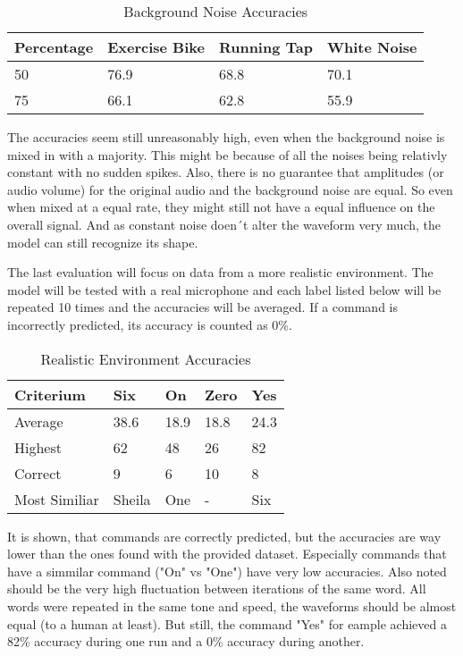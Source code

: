 \begin{table}[H]
  \begin{center}
    \begin{tabular}{l|l|l|l}
      Percentage & Exercise Bike & Running Tap & White Noise\\\hline
      50 & 76.9 & 68.8 & 70.1\\
      75 & 66.1 & 62.8 & 55.9\\
    \end{tabular}
    \caption{Background Noise Accuracies}
  \end{center}
\end{table}

The accuracies seem still unreasonably high, even when the background noise is mixed in with a majority. This might be because of all the noises being
relativly constant with no sudden spikes. Also, there is no guarantee that amplitudes (or audio volume) for the original audio and the background noise are equal. So 
even when mixed at a equal rate, they might still not have a equal influence on the overall signal. And as constant noise doen´t alter the waveform very much, the 
model can still recognize its shape.

The last evaluation will focus on data from a more realistic environment. The model will be tested with a real microphone and each label listed below will be repeated
10 times and the accuracies will be averaged. If a command is incorrectly predicted, its accuracy is counted as 0\%.

\begin{table}[H]
  \begin{center}
    \begin{tabular}{l|l|l|l|l}
    Criterium & Six & On & Zero & Yes\\\hline
    Average & 38.6 & 18.9 & 18.8 & 24.3\\
    Highest & 62 & 48 & 26 & 82\\
    Correct & 9 & 6 & 10 & 8\\
    Most Similiar & Sheila & One & - & Six\\
    \end{tabular}
    \caption{Realistic Environment Accuracies}
  \end{center}
\end{table}

It is shown, that commands are correctly predicted, but the accuracies are way lower than the ones found with the provided dataset. Especially commands that have a simmilar
command ("On" vs "One") have very low accuracies. Also noted should be the very high fluctuation between iterations of the same word. All words were repeated in the same tone and speed, the waveforms
should be almost equal (to a human at least). But still, the command "Yes" for eample achieved a 82\% accuracy during one run and a 0\% accuracy during another.
